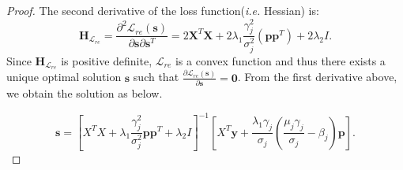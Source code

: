 \begin{proof}
The second derivative of the loss function(\textit{i.e.} Hessian) is: 
\begin{equation}
 \mathbf{H}_{\mathcal{L}_{re}} = \frac{\partial^2\mathcal{L}_{re}(\mathbf{s})}{\partial\mathbf{s}\partial\mathbf{s}^T} = 2\mathbf{X}^T\mathbf{X} + 2\lambda_1\frac{\gamma_{j}^2}{\sigma_{j}^2}(\mathbf{p}\mathbf{p}^T)+2\lambda_2I.
 \nonumber
\end{equation}
Since $\mathbf{H}_{\mathcal{L}_{re}}$ is positive definite, $\mathcal{L}_{re}$ is a convex function and thus there exists a unique optimal solution $\mathbf{s}$ such that $\frac{\partial\mathcal{L}_{re}(\mathbf{s})}{\partial\mathbf{s}} = \mathbf{0}$. From the first derivative above, we obtain the solution as below.

\begin{equation}
 \boldsymbol{s}=[X^{T}X+\lambda_{1}\frac{\gamma_{j}^2}{\sigma_{j}^2}\boldsymbol{p}\boldsymbol{p}^{T}+\lambda_{2}I]^{-1}[X^{T}\boldsymbol{y}+\frac{\lambda_{1}\gamma_{j}}{\sigma_{j}}(\frac{\mu_{j}\gamma_{j}}{\sigma_{j}}-\beta_{j})\boldsymbol{p}].
\nonumber
\end{equation}
\end{proof}


